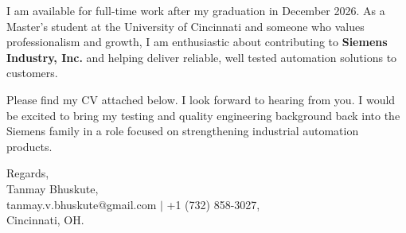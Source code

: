 \documentclass[11pt]{letter}
\begin{document}
\begin{letter}{}
I am available for full-time work after my graduation in December 2026. As a Master's student at the University of Cincinnati and someone who values professionalism and growth, I am enthusiastic about contributing to \textbf{Siemens Industry, Inc.} and helping deliver reliable, well tested automation solutions to customers.

Please find my CV attached below. I look forward to hearing from you. I would be excited to bring my testing and quality engineering background back into the Siemens family in a role focused on strengthening industrial automation products.

{\setlength{\parskip}{0pt}
Regards,\\
Tanmay Bhuskute,\\
tanmay.v.bhuskute@gmail.com $\mid$ +1 (732) 858-3027,\\
Cincinnati, OH.
}

\end{letter}
\end{document}
